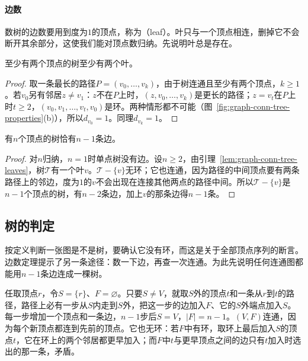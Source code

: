 \paragraph{边数}
数树的边数要用到度为$1$的顶点，称为（leaf）。叶只与一个顶点相连，删掉它不会断开其余部分，这使我们能对顶点数归纳。先说明叶总是存在。

\begin{lemma}[树有叶]
\label{lem:graph-conn-tree-leaves}
至少有两个顶点的树至少有两个叶。
\end{lemma}

\begin{proof}
取一条最长的路径$P=(v_0,\ldots,v_k)$，由于树连通且至少有两个顶点，$k\geq1$。若$v_0$另有邻居$z\neq v_1$：$z$不在$P$上时，$(z,v_0,\ldots,v_k)$是更长的路径；$z=v_t$在$P$上时$t\geq2$，$(v_0,v_1,\ldots,v_t,v_0)$是环。两种情形都不可能（图~\ref{fig:graph-conn-tree-properties}(b)），所以$d_{v_0}=1$。同理$d_{v_k}=1$。
\end{proof}

\begin{theorem}[树的边数]
\label{thm:graph-conn-tree-edges}
有$n$个顶点的树恰有$n-1$条边。
\end{theorem}

\begin{proof}
对$n$归纳，$n=1$时单点树没有边。设$n\geq2$，由引理~\ref{lem:graph-conn-tree-leaves}，树$\mathcal T$有一个叶$v$。$\mathcal T-\{v\}$无环；它也连通，因为路径的中间顶点要有两条路径上的邻边，度为$1$的$v$不会出现在连接其他两点的路径中间。所以$\mathcal T-\{v\}$是$n-1$个顶点的树，有$n-2$条边，加上$v$的那条边得$n-1$条。
\end{proof}

\subsection{树的判定}
\label{sec:graph-conn-tree-test}

按定义判断一张图是不是树，要确认它没有环，而这是关于全部顶点序列的断言。边数定理提示了另一条途径：数一下边，再查一次连通。为此先说明任何连通图都能用$n-1$条边连成一棵树。

任取顶点$r$，令$S=\{r\}$、$F=\varnothing$。只要$S\neq V$，就取$S$外的顶点$t$和一条从$r$到$t$的路径，路径上必有一步从$S$内走到$S$外，把这一步的边加入$F$、它的$S$外端点加入$S$。每一步增加一个顶点和一条边，$n-1$步后$S=V$，$|F|=n-1$。$(V,F)$连通，因为每个新顶点都连到先前的顶点。它也无环：若$F$中有环，取环上最后加入$S$的顶点$t$，它在环上的两个邻居都更早加入；而$F$中$t$与更早顶点之间的边只有$t$加入时选出的那一条，矛盾。

